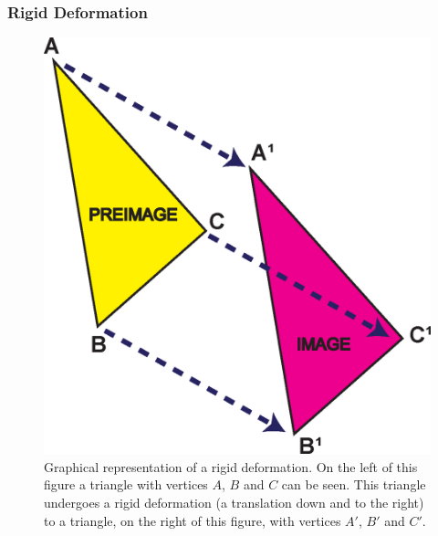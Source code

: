             
            \subsubsection{Rigid Deformation} \label{sec:rigid_deformation}
                \begin{figure}
                    \centering
                    
                    \includegraphics[width=1.0\linewidth]{figures/background_rd.png}
                    
                    \captionsetup{singlelinecheck=false}
                    \caption{
                        Graphical representation of a rigid deformation. On the left of this figure a triangle with vertices $A$, $B$ and $C$ can be seen. This triangle undergoes a rigid deformation (a translation down and to the right) to a triangle, on the right of this figure, with vertices $A'$, $B'$ and $C'$.
                    }
                    \label{fig:rigid_transformations_rd}
                \end{figure}
                
